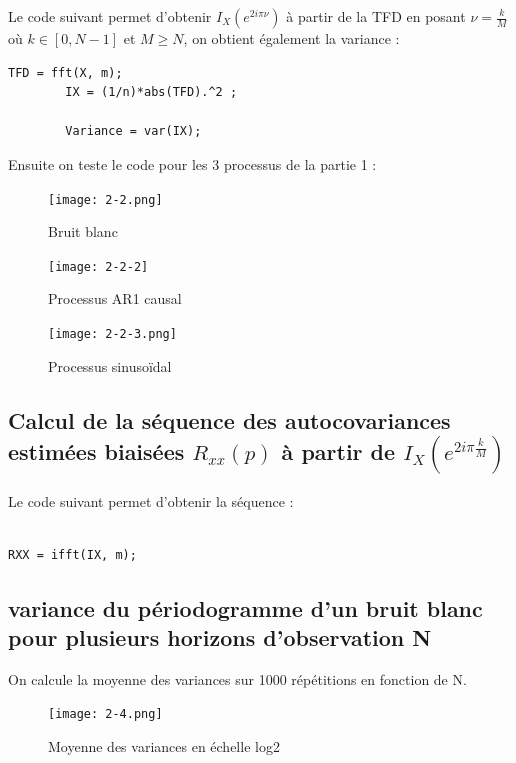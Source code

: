 \documentclass{article}
\begin{document}
Le code suivant permet d'obtenir $I_{X}(e^{2i\pi\nu})$ à partir de la TFD en posant $\nu=\frac{k}{M}$ où $k\in[0,N-1]$ et $M\geq N$, on obtient également la variance :
\begin{lstlisting}
TFD = fft(X, m);
        IX = (1/n)*abs(TFD).^2 ; 

        Variance = var(IX);
\end{lstlisting}

Ensuite on teste le code pour les 3 processus de la partie 1 :


\begin{figure}[h!]
    \begin{minipage}[c]{.46\linewidth}
        \centering
        \texttt{[image: 2-2.png]}
        \caption{Bruit blanc}
    \end{minipage}
    \hfill%
    \begin{minipage}[c]{.46\linewidth}
        \centering
        \texttt{[image: 2-2-2]}
        \caption{Processus AR1 causal}
    \end{minipage}
\end{figure}


\begin{figure}[!h]
    \center
    \texttt{[image: 2-2-3.png]}
    \caption{Processus sinusoïdal}
\end{figure}



\subsection{Calcul de la séquence des autocovariances estimées biaisées $R_{xx}(p)$ à partir de $I_{X}(e^{2i\pi\frac{k}{M}})$}

Le code suivant permet d'obtenir la séquence : 
\begin{lstlisting}

RXX = ifft(IX, m);
\end{lstlisting}

\subsection{variance du périodogramme d'un bruit blanc pour plusieurs horizons d'observation N}
On calcule la moyenne des variances sur 1000 répétitions en fonction de N.
\begin{figure}[!h]
    \center
    \texttt{[image: 2-4.png]}
    \caption{Moyenne des variances en échelle log2}
\end{figure}
\end{document}
